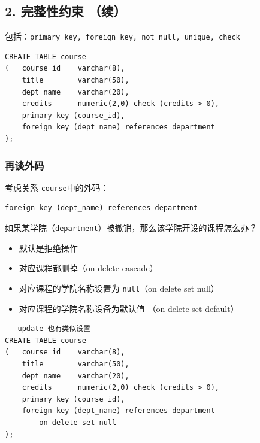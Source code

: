 \documentclass[aspectratio=169, 14pt]{beamer}
\begin{document}
\begin{frame}
    \section{\textcolor{darkmidnightblue}{2. 完整性约束 （续）}}
    包括：\texttt{primary key, foreign key, not null, unique, check}

\end{frame}

\begin{frame}[fragile]

    \begin{verbatim}
CREATE TABLE course
(   course_id    varchar(8), 
    title        varchar(50), 
    dept_name    varchar(20),
    credits      numeric(2,0) check (credits > 0),
    primary key (course_id),
    foreign key (dept_name) references department
);
    \end{verbatim}

\end{frame}

\begin{frame}[fragile]
    \frametitle{再谈外码}

考虑关系 \texttt{course}中的外码：

\begin{verbatim}
foreign key (dept_name) references department 
\end{verbatim}

{\large {}}  如果某学院（\texttt{department}）被撤销，那么该学院开设的课程怎么办？
\pause
\begin{itemize}
    \item 默认是拒绝操作
    \item 对应课程都删掉（\alert{on delete cascade}）
    \item 对应课程的学院名称设置为 \texttt{null}（\alert{on delete set null}）
    \item 对应课程的学院名称设备为默认值 （\alert{on delete set default}）    
\end{itemize}

\end{frame}

\begin{frame}[fragile]

    \begin{verbatim}
-- update 也有类似设置
CREATE TABLE course
(   course_id    varchar(8), 
    title        varchar(50), 
    dept_name    varchar(20),
    credits      numeric(2,0) check (credits > 0),
    primary key (course_id),
    foreign key (dept_name) references department
        on delete set null
);
    \end{verbatim}
\end{frame}
\end{document}
